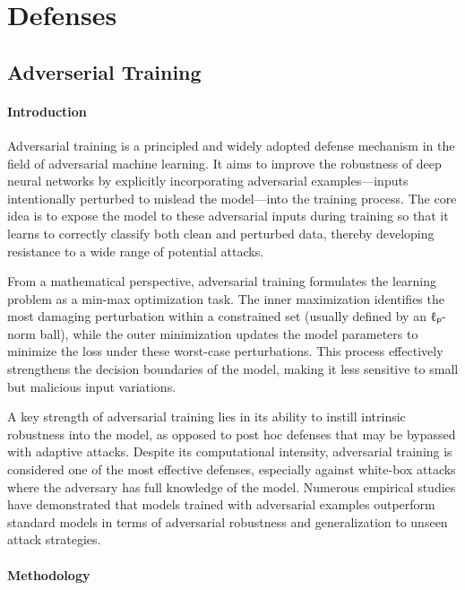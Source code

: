 \documentclass[../main.tex]{subfiles}
\begin{document}
\clearpage
\section{Defenses}


\subsection{Adverserial Training}
\paragraph{Introduction}
Adversarial training is a principled and widely adopted defense mechanism in the field of adversarial machine learning. It aims to improve the robustness of deep neural networks by explicitly incorporating adversarial examples—inputs intentionally perturbed to mislead the model—into the training process. The core idea is to expose the model to these adversarial inputs during training so that it learns to correctly classify both clean and perturbed data, thereby developing resistance to a wide range of potential attacks.

From a mathematical perspective, adversarial training formulates the learning problem as a min-max optimization task. The inner maximization identifies the most damaging perturbation within a constrained set (usually defined by an ℓₚ-norm ball), while the outer minimization updates the model parameters to minimize the loss under these worst-case perturbations. This process effectively strengthens the decision boundaries of the model, making it less sensitive to small but malicious input variations.

A key strength of adversarial training lies in its ability to instill intrinsic robustness into the model, as opposed to post hoc defenses that may be bypassed with adaptive attacks. Despite its computational intensity, adversarial training is considered one of the most effective defenses, especially against white-box attacks where the adversary has full knowledge of the model. Numerous empirical studies have demonstrated that models trained with adversarial examples outperform standard models in terms of adversarial robustness and generalization to unseen attack strategies.
\cite{zheng2020efficientadversarialtrainingtransferable}

\paragraph{Methodology}
\end{document}
